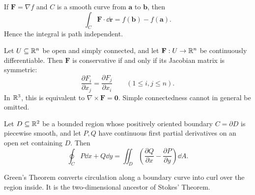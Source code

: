     \begin{theorem}
        If $\mathbf{F}=\nabla f$ and $C$ is a smooth curve from $\mathbf{a}$ to
        $\mathbf{b}$, then
        \[
            \int_C \mathbf{F}\cdot\dd\mathbf{r}
            =
            f(\mathbf{b})-f(\mathbf{a}).
        \]
        Hence the integral is path independent.
    \end{theorem}

    \begin{proposition}
        Let $U\subseteq\mathbb{R}^n$ be open and simply connected, and let
        $\mathbf{F}:U\to\mathbb{R}^n$ be continuously differentiable. Then
        $\mathbf{F}$ is conservative if and only if its Jacobian matrix is
        symmetric:
        \[
            \frac{\partial F_i}{\partial x_j}
            =
            \frac{\partial F_j}{\partial x_i}
            \qquad(1\leq i,j\leq n).
        \]
        In $\mathbb{R}^3$, this is equivalent to $\nabla\times\mathbf{F}=\mathbf{0}$.
        Simple connectedness cannot in general be omitted.
    \end{proposition}

    \begin{theorem}
        Let $D\subseteq\mathbb{R}^2$ be a bounded region whose positively oriented
        boundary $C=\partial D$ is piecewise smooth, and let $P,Q$ have
        continuous first partial derivatives on an open set containing $D$.
        Then
        \[
            \oint_C P\dd x+Q\dd y
            =
            \iint_D
            \left(
                \frac{\partial Q}{\partial x}
                -
                \frac{\partial P}{\partial y}
            \right)\dd A.
        \]
    \end{theorem}

    \begin{idea}
        Green's Theorem converts circulation along a boundary curve into curl
        over the region inside. It is the two-dimensional ancestor of Stokes'
        Theorem.
    \end{idea}


